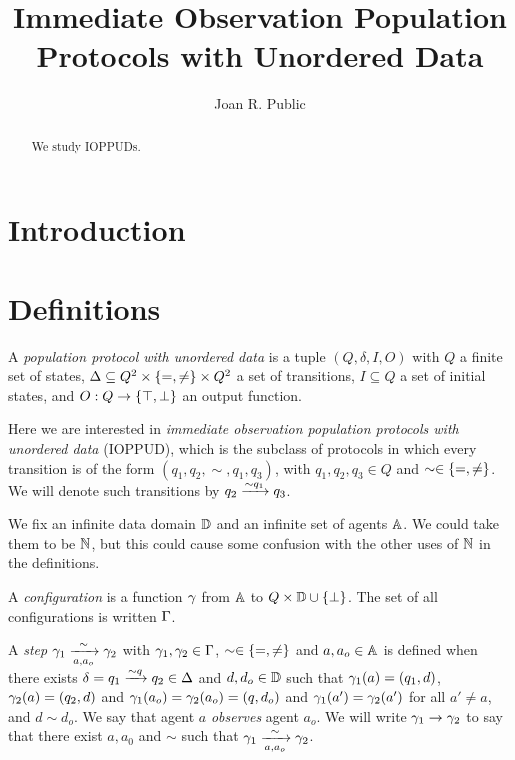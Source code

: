 \documentclass[a4paper,UKenglish,cleveref, autoref, thm-restate]{lipics-v2021}
\title{Immediate Observation Population Protocols with Unordered Data}
\author{Joan R. Public}{Department of Informatics, Dummy College, Country}{joanrpublic@dummycollege.org}{}{}
\begin{document}
	
	\maketitle
	
	
	\begin{abstract}
		We study IOPPUDs.
	\end{abstract}
	
	\section{Introduction}
	
	\section{Definitions}
	
	\begin{definition}
		A \emph{population protocol with unordered data} is a tuple $(Q, \delta, I, O)$ with $Q$ a finite set of states,
		$\Delta \subseteq Q^2 \times \{=, \neq\} \times Q^2$ a set of transitions,
		$I \subseteq Q$ a set of initial states, and
		$O : Q \to \{\top, \bot\}$ an output function.
		
		Here we are interested in \emph{immediate observation population protocols with unordered data} (IOPPUD), which is the subclass of protocols in which every transition is of the form $(q_1, q_2, \sim, q_1, q_3)$, with $q_1, q_2, q_3 \in Q$ and $\sim \in \{=, \neq\}$.
		We will denote such transitions by $q_2 \xrightarrow{\sim q_1} q_3$.
	\end{definition}
	
	We fix an infinite data domain $\mathbb{D}$ and an infinite set of agents $\mathbb{A}$. We could take them to be $\mathbb{N}$, but this could cause some confusion with the other uses of $\mathbb{N}$ in the definitions.
	
	A \emph{configuration} is a function $\gamma$ from $\mathbb{A}$ to $Q \times \mathbb{D} \cup \{\bot\}$. The set of all configurations is written $\Gamma$.
	
	A \emph{step} $\gamma_1 \xrightarrow[a, a_o]{\sim} \gamma_2$ with $\gamma_1, \gamma_2 \in \Gamma$, $\sim \in \{=, \neq\}$ and $a, a_o \in \mathbb{A}$ is defined when there exists  $\delta = q_1 \xrightarrow{\sim q} q_2 \in \Delta$ and $d, d_o \in \mathbb{D}$ such that $\gamma_1(a) = (q_1, d)$, $\gamma_2(a) = (q_2, d)$ and $\gamma_1(a_o) = \gamma_2(a_o) = (q, d_o)$ and $\gamma_1(a') = \gamma_2(a')$ for all $a' \neq a$, and $d \sim d_o$.
	We say that agent $a$ \emph{observes} agent $a_o$. 
	We will write $\gamma_1 \to \gamma_2$ to say that there exist $a, a_0$ and $\sim$ such that $\gamma_1 \xrightarrow[a, a_o]{\sim} \gamma_2$.
	
\end{document}
